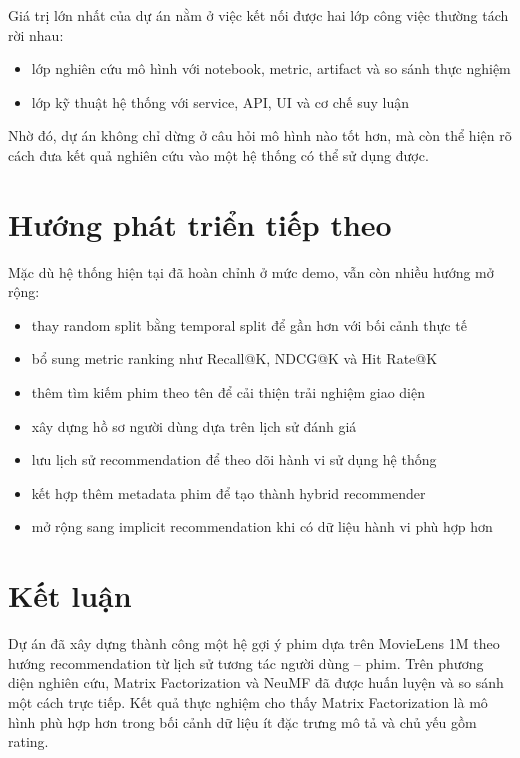 \documentclass[12pt,a4paper]{article}
\begin{document}
Giá trị lớn nhất của dự án nằm ở việc kết nối được hai lớp công việc thường tách rời nhau:

\begin{itemize}[leftmargin=1.5cm]
    \item lớp nghiên cứu mô hình với notebook, metric, artifact và so sánh thực nghiệm
    \item lớp kỹ thuật hệ thống với service, API, UI và cơ chế suy luận
\end{itemize}

Nhờ đó, dự án không chỉ dừng ở câu hỏi mô hình nào tốt hơn, mà còn thể hiện rõ cách đưa kết quả nghiên cứu vào một hệ thống có thể sử dụng được.

\section{Hướng phát triển tiếp theo}

Mặc dù hệ thống hiện tại đã hoàn chỉnh ở mức demo, vẫn còn nhiều hướng mở rộng:

\begin{itemize}[leftmargin=1.5cm]
    \item thay random split bằng temporal split để gần hơn với bối cảnh thực tế
    \item bổ sung metric ranking như Recall@K, NDCG@K và Hit Rate@K
    \item thêm tìm kiếm phim theo tên để cải thiện trải nghiệm giao diện
    \item xây dựng hồ sơ người dùng dựa trên lịch sử đánh giá
    \item lưu lịch sử recommendation để theo dõi hành vi sử dụng hệ thống
    \item kết hợp thêm metadata phim để tạo thành hybrid recommender
    \item mở rộng sang implicit recommendation khi có dữ liệu hành vi phù hợp hơn
\end{itemize}

\section{Kết luận}

Dự án đã xây dựng thành công một hệ gợi ý phim dựa trên MovieLens 1M theo hướng recommendation từ lịch sử tương tác người dùng -- phim. Trên phương diện nghiên cứu, Matrix Factorization và NeuMF đã được huấn luyện và so sánh một cách trực tiếp. Kết quả thực nghiệm cho thấy Matrix Factorization là mô hình phù hợp hơn trong bối cảnh dữ liệu ít đặc trưng mô tả và chủ yếu gồm rating.
\end{document}

